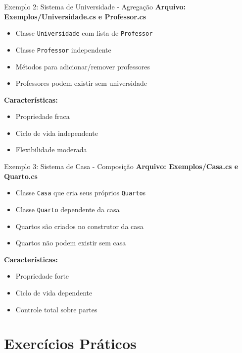 \documentclass[aspectratio=169]{beamer}
\begin{document}
\begin{frame}{Exemplo 2: Sistema de Universidade - Agregação}
\textbf{Arquivo: Exemplos/Universidade.cs e Professor.cs}
\begin{itemize}
\item Classe \texttt{Universidade} com lista de \texttt{Professor}
\item Classe \texttt{Professor} independente
\item Métodos para adicionar/remover professores
\item Professores podem existir sem universidade
\end{itemize}

\vspace{0.3cm}
\textbf{Características:}
\begin{itemize}
\item Propriedade fraca
\item Ciclo de vida independente
\item Flexibilidade moderada
\end{itemize}
\end{frame}

\begin{frame}{Exemplo 3: Sistema de Casa - Composição}
\textbf{Arquivo: Exemplos/Casa.cs e Quarto.cs}
\begin{itemize}
\item Classe \texttt{Casa} que cria seus próprios \texttt{Quarto}s
\item Classe \texttt{Quarto} dependente da casa
\item Quartos são criados no construtor da casa
\item Quartos não podem existir sem casa
\end{itemize}

\vspace{0.3cm}
\textbf{Características:}
\begin{itemize}
\item Propriedade forte
\item Ciclo de vida dependente
\item Controle total sobre partes
\end{itemize}
\end{frame}

\section{Exercícios Práticos}
\end{document}
